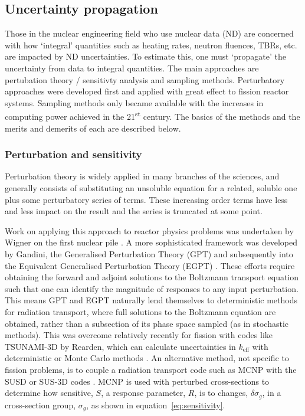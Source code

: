 \FloatBarrier
\subsection{Uncertainty propagation}
Those in the nuclear engineering field who use nuclear data (ND) are concerned with how `integral' quantities such as heating rates, neutron fluences, TBRs, etc. are impacted by ND uncertainties. To estimate this, one must `propagate' the uncertainty from data to integral quantities. The main approaches are pertubation theory / sensitivty analysis and sampling methods. Perturbatory approaches were developed first and applied with great effect to fission reactor systems. Sampling methods only became available with the increases in computing power achieved in the 21\textsuperscript{st} century. The basics of the methods and the merits and demerits of each are described below.

\FloatBarrier
\subsubsection{Perturbation and sensitivity}
\label{subsubsec:pert}
Perturbation theory is widely applied in many branches of the sciences, and generally consists of substituting an unsoluble equation for a related, soluble one plus some perturbatory series of terms. These increasing order terms have less and less impact on the result and the series is truncated at some point. 

Work on applying this approach to reactor physics problems was undertaken by Wigner on the first nuclear pile \cite{Rising2012}. A more sophisticated framework was developed by Gandini, the Generalised Perturbation Theory (GPT) \cite{Gandini1967} and subsequently into the Equivalent Generalised Perturbation Theory (EGPT) \cite{Gandini1986}. These efforts require obtaining the forward and adjoint solutions to the Boltzmann transport equation such that one can identify the magnitude of responses to any input perturbation. This means GPT and EGPT naturally lend themselves to deterministic methods for radiation transport, where full solutions to the Boltzmann equation are obtained, rather than a subsection of its phase space sampled (as in stochastic methods). This was overcome relatively recently for fission with codes like TSUNAMI-3D by Rearden, which can calculate uncertainties in $k_{\mathrm{eff}}$ with deterministic or Monte Carlo methods \cite{Rearden2004}. An alternative method, not specific to fission problems, is to couple a radiation transport code such as MCNP \cite{Goorley2012} with the SUSD or SUS-3D codes \cite{Kodeli2001}. MCNP is used with perturbed cross-sections to determine how sensitive, $S$, a response parameter, $R$, is to changes, $\delta \sigma_{g}$, in a cross-section group, $\sigma_{g}$, as shown in equation~\ref{eq:sensitivity}. 

